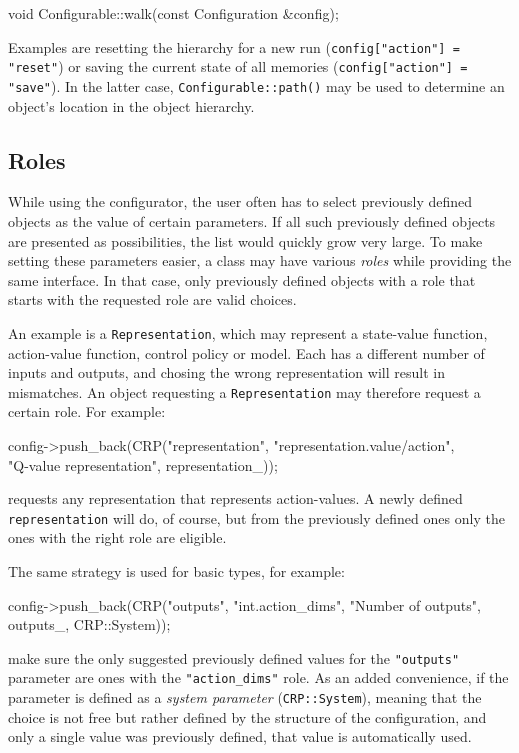 \documentclass{article}
\newcommand{\txt}[1]{\texttt{#1}}
\newenvironment{code}{\alltt}{\endalltt}
\begin{document}
\begin{code}
void Configurable::walk(const Configuration &config);
\end{code}

Examples are resetting the hierarchy for a new run (\txt{config["action"] =
"reset"}) or saving the current state of all memories (\txt{config["action"]
= "save"}). In the latter case, \txt{Configurable::path()} may be used to
determine an object's location in the object hierarchy.

\subsection{Roles}

While using the configurator, the user often has to select previously
defined objects as the value of certain parameters. If all such previously
defined objects are presented as possibilities, the list would quickly grow
very large. To make setting these parameters easier, a class may have
various \emph{roles} while providing the same interface. In that case,
only previously defined objects with a role that starts with the requested
role are valid choices.

An example is a \txt{Representation}, which may represent a state-value function,
action-value function, control policy or model. Each has a different number
of inputs and outputs, and chosing the wrong representation will result in
mismatches. An object requesting a \txt{Representation} may therefore request
a certain role. For example:

\begin{code}
config->push_back(CRP("representation", "representation.value/action",\\
                      "Q-value representation", representation_));
\end{code}

requests any representation that represents action-values. A newly
defined \txt{representation} will do, of course, but from the previously
defined ones only the ones with the right role are eligible.

The same strategy is used for basic types, for example:

\begin{code}
config->push_back(CRP("outputs", "int.action_dims",
                      "Number of outputs", outputs_, CRP::System));
\end{code}

make sure the only suggested previously defined values for the
\txt{"outputs"} parameter are ones with the \txt{"action\_dims"} role. As an added
convenience, if the parameter is defined as a \emph{system parameter}
(\txt{CRP::System}), meaning that the choice is not free but rather defined
by the structure of the configuration, and only a single value was
previously defined, that value is automatically used.
\end{document}

